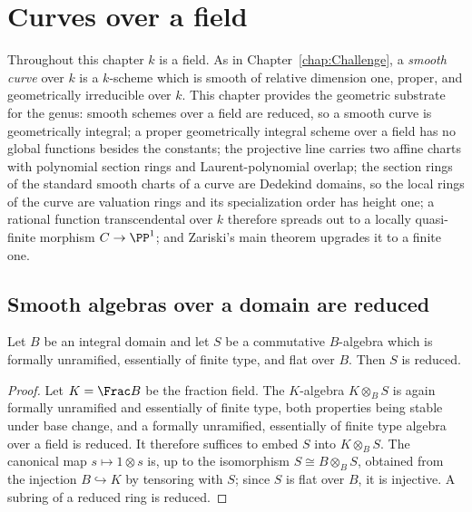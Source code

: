 \chapter{Curves over a field}
\label{chap:Curves}

Throughout this chapter \(k\) is a field. As in Chapter~\ref{chap:Challenge}, a \emph{smooth
curve} over \(k\) is a \(k\)-scheme which is smooth of relative dimension one, proper, and
geometrically irreducible over \(k\). This chapter provides the geometric substrate for the
genus: smooth schemes over a field are reduced, so a smooth curve is geometrically integral;
a proper geometrically integral scheme over a field has no global functions besides the
constants; the projective line carries two affine charts with polynomial section rings and
Laurent-polynomial overlap; the section rings of the standard smooth charts of a curve are
Dedekind domains, so the local rings of the curve are valuation rings and its
specialization order has height one; a rational function transcendental over \(k\) therefore
spreads out to a locally quasi-finite morphism \(C \to \PP^1\); and Zariski's main theorem
upgrades it to a finite one.

\section{Smooth algebras over a domain are reduced}

\begin{lemma}
  \label{lem:unramified_flat_reduced}
  \leanok
  Let \(B\) be an integral domain and let \(S\) be a commutative \(B\)-algebra which is
  formally unramified, essentially of finite type, and flat over \(B\). Then \(S\) is reduced.
\end{lemma}
\begin{proof}
  \leanok
  Let \(K = \Frac B\) be the fraction field. The \(K\)-algebra \(K \otimes_B S\) is again
  formally unramified and essentially of finite type, both properties being stable under base
  change, and a formally unramified, essentially of finite type algebra over a field is
  reduced. It therefore suffices to embed \(S\) into \(K \otimes_B S\). The canonical map
  \(s \mapsto 1 \otimes s\) is, up to the isomorphism \(S \cong B \otimes_B S\), obtained from
  the injection \(B \hookrightarrow K\) by tensoring with \(S\); since \(S\) is flat over
  \(B\), it is injective. A subring of a reduced ring is reduced.
\end{proof}

